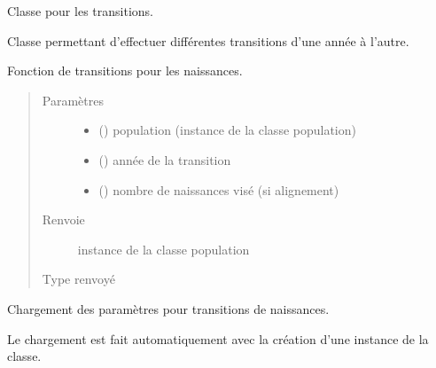 \documentclass[letterpaper,10pt,french]{sphinxmanual}
\begin{document}
\begin{fulllineitems}
\label{\detokenize{code:simgen.update}}
Classe pour les transitions.

Classe permettant d’effectuer différentes transitions d’une année à l’autre.

\begin{fulllineitems}
\label{\detokenize{code:simgen.update.birth}}
Fonction de transitions pour les naissances.
\begin{quote}\begin{description}
\item[{Paramètres}] \leavevmode\begin{itemize}
\item {} 
 ({\hyperref[\detokenize{code:simgen.population}]{}}) \textendash{} population (instance de la classe population)

\item {} 
 () \textendash{} année de la transition

\item {} 
 () \textendash{} nombre de naissances visé (si alignement)

\end{itemize}

\item[{Renvoie}] \leavevmode
instance de la classe population

\item[{Type renvoyé}] \leavevmode
{\hyperref[\detokenize{code:simgen.population}]{}}

\end{description}\end{quote}

\end{fulllineitems}


\begin{fulllineitems}
\label{\detokenize{code:simgen.update.params_birth}}
Chargement des paramètres pour transitions de naissances.

Le chargement est fait automatiquement avec la création d’une instance de la classe.

\end{fulllineitems}


\end{fulllineitems}
\end{document}
